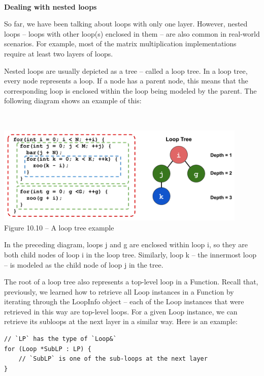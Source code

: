 \hspace*{\fill} \\ %
\noindent
\textbf{Dealing with nested loops}

So far, we have been talking about loops with only one layer. However, nested loops – loops with other loop(s) enclosed in them – are also common in real-world scenarios. For example, most of the matrix multiplication implementations require at least two layers of loops.

Nested loops are usually depicted as a tree – called a loop tree. In a loop tree, every node represents a loop. If a node has a parent node, this means that the corresponding loop is enclosed within the loop being modeled by the parent. The following diagram shows an example of this:

\hspace*{\fill} \\ %
\begin{center}
\includegraphics[width=0.9\textwidth]{content/3/chapter10/images/10.png}\\
Figure 10.10 – A loop tree example
\end{center}

In the preceding diagram, loops j and g are enclosed within loop i, so they are both child nodes of loop i in the loop tree. Similarly, loop k – the innermost loop – is modeled as the child node of loop j in the tree. 

The root of a loop tree also represents a top-level loop in a Function. Recall that, previously, we learned how to retrieve all Loop instances in a Function by iterating through the LoopInfo object – each of the Loop instances that were retrieved in this way are top-level loops. For a given Loop instance, we can retrieve its subloops at the next layer in a similar way. Here is an example:

\begin{lstlisting}[style=styleCXX]
// `LP` has the type of `Loop&`
for (Loop *SubLP : LP) {
	// `SubLP` is one of the sub-loops at the next layer
}
\end{lstlisting}

